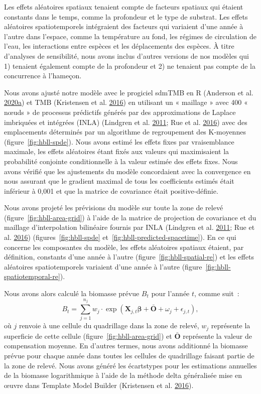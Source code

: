 \documentclass[11pt]{book}
\begin{document}
Les effets aléatoires spatiaux tenaient compte de facteurs spatiaux qui étaient constants dans le temps, comme la profondeur et le type de substrat. Les effets aléatoires spatiotemporels intégraient des facteurs qui variaient d'une année à l'autre dans l'espace, comme la température au fond, les régimes de circulation de l'eau, les interactions entre espèces et les déplacements des espèces. À titre d'analyses de sensibilité, nous avons inclus d'autres versions de nos modèles qui 1) tenaient également compte de la profondeur et 2) ne tenaient pas compte de la concurrence à l'hameçon.

Nous avons ajusté notre modèle avec le progiciel sdmTMB en R (Anderson et al. \protect\hyperlink{ref-sdmtmb}{2020}\protect\hyperlink{ref-sdmtmb}{a}) et TMB (Kristensen et al. \protect\hyperlink{ref-tmb}{2016}) en utilisant un « maillage » avec 400 « nœuds » de processus prédictifs générés par des approximations de Laplace imbriquées et intégrées (INLA) (Lindgren et al. \protect\hyperlink{ref-lindgren2011}{2011}; Rue et al. \protect\hyperlink{ref-rue2016}{2016}) avec des emplacements déterminés par un algorithme de regroupement des K-moyennes (figure~\ref{fig:hbll-spde}). Nous avons estimé les effets fixes par vraisemblance maximale, les effets aléatoires étant fixés aux valeurs qui maximisaient la probabilité conjointe conditionnelle à la valeur estimée des effets fixes. Nous avons vérifié que les ajustements du modèle concordaient avec la convergence en nous assurant que le gradient maximal de tous les coefficients estimés était inférieur à 0,001 et que la matrice de covariance était positive-définie.

Nous avons projeté les prévisions du modèle sur toute la zone de relevé (figure~\ref{fig:hbll-area-grid}) à l'aide de la matrice de projection de covariance et du maillage d'interpolation bilinéaire fournis par INLA (Lindgren et al. \protect\hyperlink{ref-lindgren2011}{2011}; Rue et al. \protect\hyperlink{ref-rue2016}{2016}) (figures~\ref{fig:hbll-spde} et~\ref{fig:hbll-predicted-spacetime}). En ce qui concerne les composantes du modèle, les effets aléatoires spatiaux étaient, par définition, constants d'une année à l'autre (figure~\ref{fig:hbll-spatial-re}) et les effets aléatoires spatiotemporels variaient d'une année à l'autre (figure~\ref{fig:hbll-spatiotemporal-re}).

Nous avons alors calculé la biomasse prévue \(B_t\) pour l'année \(t\), comme suit~:
\begin{equation}
B_t = \sum_{j = 1}^{n_j}
  w_j \cdot \exp \left( \bm{X}_{j,t} \bm{\beta} + \bar{\bm{O}} + \omega_j + \epsilon_{j,t} \right),
\end{equation}
où \(j\) renvoie à une cellule du quadrillage dans la zone de relevé, \(w_j\) représente la superficie de cette cellule (figure~\ref{fig:hbll-area-grid}) et \(\bar{\bm{O}}\) représente la valeur de compensation moyenne. En d'autres termes, nous avons additionné la biomasse prévue pour chaque année dans toutes les cellules de quadrillage faisant partie de la zone de relevé. Nous avons généré les écarts­types pour les estimations annuelles de la biomasse logarithmique à l'aide de la méthode delta généralisée mise en œuvre dans Template Model Builder (Kristensen et al. \protect\hyperlink{ref-tmb}{2016}).
\end{document}
